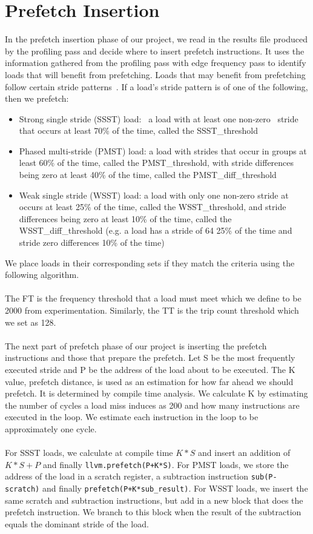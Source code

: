 \documentclass[11pt]{article}
\begin{document}
  \section{Prefetch Insertion}
  In the prefetch insertion phase of our project, we read in the results file produced by the profiling pass and decide where to insert prefetch instructions. It uses the information gathered from the profiling pass with edge frequency pass to identify loads that will benefit from prefetching. Loads that may benefit from prefetching follow certain stride patterns~\cite{Wu2002}. If a load’s stride pattern is of one of the following, then we prefetch:
  \begin{itemize}
    \item Strong single stride (SSST) load:  a load with at least one non-zero  stride that occurs at least 70\% of the time, called the SSST\_threshold
    \item Phased multi-stride (PMST) load: a load with strides that occur in groups at least 60\% of the time, called the PMST\_threshold, with stride differences being zero at least 40\% of the time, called the PMST\_diff\_threshold
    \item Weak single stride (WSST) load: a load with only one non-zero stride at occurs at least 25\% of the time, called the WSST\_threshold, and stride differences being zero at least 10\% of the time, called the WSST\_diff\_threshold (e.g. a load has a stride of 64 25\% of the time and stride zero differences 10\% of the time)
  \end{itemize}
  We place loads in their corresponding sets if they match the criteria using the following algorithm. 
  \\\\The FT is the frequency threshold that a load must meet which we define to be 2000 from experimentation. Similarly, the TT is the trip count threshold which we set as 128.
  \\\\The next part of prefetch phase of our project is inserting the prefetch instructions and those that prepare the prefetch. Let S be the most frequently executed stride and P be the address of the load about to be executed. The K value, prefetch distance, is used as an estimation for how far ahead we should prefetch. It is determined by compile time analysis. We calculate K by estimating the number of cycles a load miss induces as 200 and how many instructions are executed in the loop. We estimate each instruction in the loop to be approximately one cycle.
  \\\\For SSST loads, we calculate at compile time \(K*S\) and insert an addition of \(K*S+P\) and finally \texttt{llvm.prefetch(P+K*S)}. For PMST loads, we store the address of the load in a scratch register, a subtraction instruction \texttt{sub(P-scratch)} and finally \texttt{prefetch(P+K*sub\_result)}. For WSST loads, we insert the same scratch and subtraction instructions, but add in a new block that does the prefetch instruction. We branch to this block when the result of the subtraction equals the dominant stride of the load.
\end{document}
